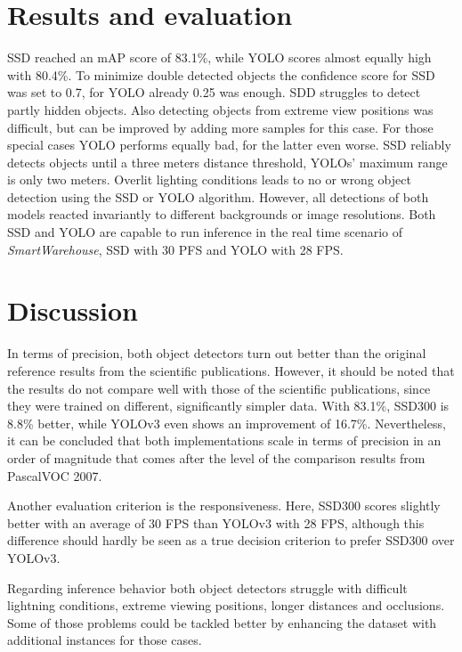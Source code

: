 \documentclass[a4paper, 10pt, journal]{wissarbIEEE}      %
\begin{document}
\section{Results and evaluation} \label{evaluation}

SSD reached an mAP score of 83.1\%, while YOLO scores almost equally high with 80.4\%. To minimize double detected objects the confidence score for SSD was set to 0.7, for YOLO already 0.25 was enough. SDD struggles to detect partly hidden objects. Also detecting objects from extreme view positions was difficult, but can be improved by adding more samples for this case. For those special cases YOLO performs equally bad, for the latter even worse. SSD reliably detects objects until a three meters distance threshold, YOLOs' maximum range is only two meters. Overlit lighting conditions leads to no or wrong object detection using the SSD or YOLO algorithm. However, all detections of both models reacted invariantly to different backgrounds or image resolutions. Both SSD and YOLO are capable to run inference in the real time scenario of \textit{SmartWarehouse}, SSD with 30 PFS and YOLO with 28 FPS. 

\section{Discussion} \label{discussion}

In terms of precision, both object detectors turn out better than the original reference results from the scientific publications. However, it should be noted that the results do not compare well with those of the scientific publications, since they were trained on different, significantly simpler data. With 83.1\%, SSD300 is 8.8\% better, while YOLOv3 even shows an improvement of 16.7\%. Nevertheless, it can be concluded that both implementations scale in terms of precision in an order of magnitude that comes after the level of the comparison results from PascalVOC 2007.

Another evaluation criterion is the responsiveness. Here, SSD300 scores slightly better with an average of 30 FPS than YOLOv3 with 28 FPS, although this difference should hardly be seen as a true decision criterion to prefer SSD300 over YOLOv3.

Regarding inference behavior both object detectors struggle with difficult lightning conditions, extreme viewing positions, longer distances and occlusions. Some of those problems could be tackled better by enhancing the dataset with additional instances for those cases.
 
\end{document}
